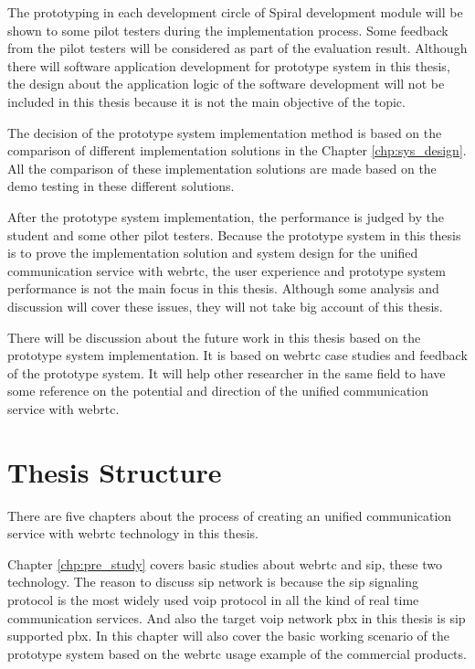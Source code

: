 \par The prototyping in each development circle of Spiral development module will be shown to some pilot testers during the implementation process. Some feedback from the pilot testers will be considered as part of the evaluation result. Although there will software application development for prototype system in this thesis, the design about the application logic of the software development will not be included in this thesis because it is not the main objective of the topic.

\par The decision of the prototype system implementation method is based on the comparison of different implementation solutions in the Chapter \ref{chp:sys_design}. All the comparison of these implementation solutions are made based on the demo testing in these different solutions.

\par After the prototype system implementation, the performance is judged by the student and some other pilot testers. Because the prototype system in this thesis is to prove the implementation solution and system design for the unified communication service with \gls{webrtc}, the user experience and prototype system performance is not the main focus in this thesis. Although some analysis and discussion will cover these issues, they will not take big account of this thesis.

\par There will be discussion about the future work in this thesis based on the prototype system implementation. It is based on \gls{webrtc} case studies and feedback of the prototype system. It will help other researcher in the same field to have some reference on the potential and direction of the unified communication service with \gls{webrtc}.

\section{Thesis Structure}

\noindent There are five chapters about the process of creating an unified communication service with \gls{webrtc} technology in this thesis.

\par Chapter \ref{chp:pre_study} covers basic studies about \gls{webrtc} and \gls{sip}, these two technology. The reason to discuss \gls{sip} network is because the \gls{sip} signaling protocol is the most widely used \gls{voip} protocol in all the kind of real time communication services. And also the target \gls{voip} network \gls{pbx} in this thesis is \gls{sip} supported \gls{pbx}. In this chapter will also cover the basic working scenario of the prototype system based on the \gls{webrtc} usage example of the commercial products.

